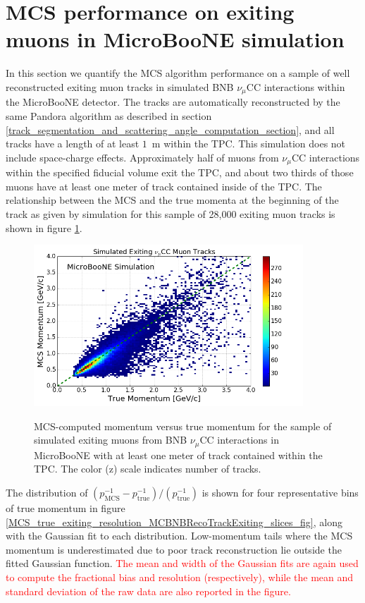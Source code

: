 \documentclass[a4paper,11pt]{article}
\begin{document}
\section{MCS performance on exiting muons in MicroBooNE simulation}
In this section we quantify the MCS algorithm performance on a sample of well reconstructed exiting muon tracks in simulated BNB $\nu_\mu$CC interactions within the MicroBooNE detector. The tracks are automatically reconstructed by the same Pandora algorithm as described in section \ref{track_segmentation_and_scattering_angle_computation_section}, and all tracks have a length of at least $1$~m within the TPC. This simulation does not include space-charge effects. Approximately half of muons from $\nu_\mu$CC interactions within the specified fiducial volume exit the TPC, and about two thirds of those muons have at least one meter of track contained inside of the TPC. The relationship between the MCS and the true momenta at the beginning of the track as given by simulation for this sample of 28,000 exiting muon tracks is shown in figure \ref{MCS_true_comparison_exiting_fig}.\\

\begin{figure}[ht!]
\centering
	\includegraphics[width=0.9\textwidth]{Figures/MCS_true_comparison_MCBNBRecoTrackExiting.png} \\
\caption{MCS-computed momentum versus true momentum for the sample of simulated exiting muons from BNB $\nu_\mu$CC interactions in MicroBooNE with at least one meter of track contained within the TPC. The color (z) scale indicates number of tracks.}\label{MCS_true_comparison_exiting_fig}
\end{figure}

The distribution of $(p_{\text{MCS}}^{-1} - p_{\text{true}}^{-1})/(p_{\text{true}}^{-1})$ is shown for four representative bins of true momentum in figure \ref{MCS_true_exiting_resolution_MCBNBRecoTrackExiting_slices_fig}, along with the Gaussian fit to each distribution. Low-momentum tails where the MCS momentum is underestimated due to poor track reconstruction lie outside the fitted Gaussian function. \textcolor{red}{The mean and width of the Gaussian fits are again used to compute the fractional bias and resolution (respectively), while the mean and standard deviation of the raw data are also reported in the figure.}\\
\end{document}
